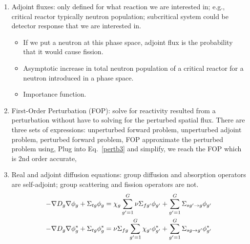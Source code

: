 \documentclass{school-22.211-notes}
\begin{document}
\clearpage
{}
\begin{enumerate}
\item Adjoint fluxes: only defined for what reaction we are interested in; e.g., critical reactor typically neutron population; subcritical system could be detector response that we are interested in.  
  \begin{itemize}
  \item If we put a neutron at this phase space, adjoint flux is the probability that it would cause fission. 
  \item Asymptotic increase in total neutron population of a critical reactor for a neutron introduced in a phase space.
  \item Importance function. 
  \end{itemize}
  
\item  First-Order Perturbation (FOP): solve for reactivity resulted from a perturbation without have to solving for the perturbed spatial flux. There are three sets of expressions: unperturbed forward problem, unperturbed adjoint problem, perturbed forward problem, 
FOP approximate the perturbed problem using, 
Plug into Eq.~\ref{pertb3} and simplify, we reach the FOP which is 2nd order accurate, 


  \item Real and adjoint diffusion equations: group diffusion and absorption operators are self-adjoint; group scattering and fission operators are not. 
    \begin{align}
      -\nabla D_g  \nabla \phi_g + \Sigma_{tg} \phi_g &= \chi_g \displaystyle\sum_{g'=1}^G \nu \Sigma_{fg'}  \phi_{g'} + \displaystyle\sum_{g'=1}^G \Sigma_{sg'\to g} \phi_{g'} \\
      -\nabla D_g  \nabla \phi_g^* + \Sigma_{tg}  \phi_g^* &= \nu \Sigma_{fg}  \displaystyle\sum_{g'=1}^G  \chi_{g'} \phi_{g'}^*  + \displaystyle\sum_{g'=1}^G \Sigma_{sg\to g'}  \phi_{g'}^*
    \end{align}


\end{enumerate}
\end{document}
